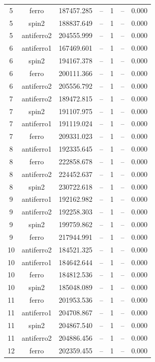 \begin{longtable}{@{}ccrrrrr@{}}
5 & ferro & 187457.285 & -- & 1 & -- & 0.000 \\
5 & spin2 & 188837.649 & -- & 1 & -- & 0.000 \\
5 & antiferro2 & 204555.999 & -- & 1 & -- & 0.000 \\
\rowcolor{gray!20} 6 & antiferro1 & 167469.601 & -- & 1 & -- & 0.000 \\
6 & spin2 & 194167.378 & -- & 1 & -- & 0.000 \\
6 & ferro & 200111.366 & -- & 1 & -- & 0.000 \\
6 & antiferro2 & 205556.792 & -- & 1 & -- & 0.000 \\
\rowcolor{gray!20} 7 & antiferro2 & 189472.815 & -- & 1 & -- & 0.000 \\
7 & spin2 & 191107.975 & -- & 1 & -- & 0.000 \\
7 & antiferro1 & 191119.024 & -- & 1 & -- & 0.000 \\
7 & ferro & 209331.023 & -- & 1 & -- & 0.000 \\
\rowcolor{gray!20} 8 & antiferro1 & 192335.645 & -- & 1 & -- & 0.000 \\
8 & ferro & 222858.678 & -- & 1 & -- & 0.000 \\
8 & antiferro2 & 224452.637 & -- & 1 & -- & 0.000 \\
8 & spin2 & 230722.618 & -- & 1 & -- & 0.000 \\
\rowcolor{gray!20} 9 & antiferro1 & 192162.982 & -- & 1 & -- & 0.000 \\
9 & antiferro2 & 192258.303 & -- & 1 & -- & 0.000 \\
9 & spin2 & 199759.862 & -- & 1 & -- & 0.000 \\
9 & ferro & 217944.991 & -- & 1 & -- & 0.000 \\
\rowcolor{gray!20} 10 & antiferro2 & 184521.325 & -- & 1 & -- & 0.000 \\
10 & antiferro1 & 184642.644 & -- & 1 & -- & 0.000 \\
10 & ferro & 184812.536 & -- & 1 & -- & 0.000 \\
10 & spin2 & 185048.089 & -- & 1 & -- & 0.000 \\
\rowcolor{gray!20} 11 & ferro & 201953.536 & -- & 1 & -- & 0.000 \\
11 & antiferro1 & 204708.867 & -- & 1 & -- & 0.000 \\
11 & spin2 & 204867.540 & -- & 1 & -- & 0.000 \\
11 & antiferro2 & 204886.456 & -- & 1 & -- & 0.000 \\
\rowcolor{gray!20} 12 & ferro & 202359.455 & -- & 1 & -- & 0.000 \\

\end{longtable}
